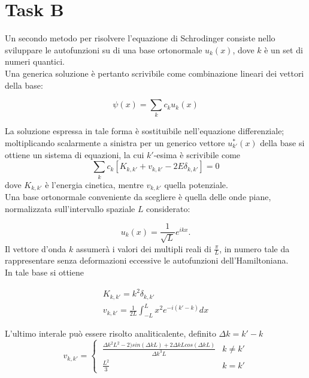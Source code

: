 \documentclass[a4paper,11pt]{article}
\begin{document}
\newpage

\section*{Task B}

Un secondo metodo per risolvere l'equazione di Schrodinger consiste nello sviluppare le autofunzioni su di una base ortonormale $u_k(x)$, dove $k$ è un set di numeri quantici. \\
Una generica soluzione è pertanto scrivibile come combinazione lineari dei vettori della base:

\begin{equation}
\psi(x)= \sum_k  c_k u_k(x)
\end{equation}


La soluzione espressa in tale forma è sostituibile nell'equazione differenziale; moltiplicando scalarmente a sinistra per un generico vettore $u^*_{k'}(x)$ della base si ottiene un sistema di equazioni, la  cui $k'$-esima è scrivibile come
\begin{equation}
\sum_k c_k \left[ K_{k,k'} + v_{k,k'} - 2E \delta_{k,k'} \right] = 0
\end{equation}
dove $K_{k,k'}$ è l'energia cinetica, mentre $v_{k,k'}$ quella potenziale. \\
Una base ortonormale conveniente da scegliere è quella delle onde piane, normalizzata sull'intervallo spaziale $L$ considerato:

\begin{equation}
u_k(x) = \frac{1}{\sqrt{L}} e^{ikx}.
\end{equation}
Il vettore d'onda $k$ assumerà i valori dei multipli reali di $\frac{\pi}{L}$, in numero tale da rappresentare senza deformazioni eccessive le autofunzioni dell'Hamiltoniana. \\
In tale base si ottiene

\begin{equation}
\begin{array}{lr}
K_{k,k'} = k^2 \delta_{k,k'} \\
v_{k,k'} = \frac{1}{2L} \int_{-L}^L x^2 e^{-i(k'-k)} dx
\end{array}
\end{equation}


L'ultimo interale può essere risolto analiticalente, definito $\Delta k = k' - k$
\begin{equation}
v_{k,k'} = \left\{\
\begin{array}{lr}
\frac{\Delta k^2 L^2 - 2)sin(\Delta kL) + 2\Delta kL cos(\Delta k L)}{\Delta k ^3 L} & k \neq k' \\
\frac{L^2}{3} & k = k'
\end{array}
\right.
\end{equation}
\end{document}
